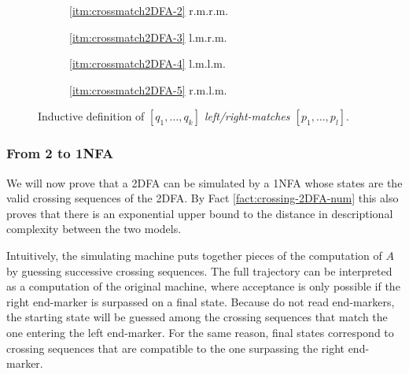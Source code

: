 \begin{figure}
    \centering
    \begin{subfigure}{0.246\textwidth}
        \centering
		
		\caption*{\ref{itm:crossmatch2DFA-2} r.m.\tto r.m.}
    \end{subfigure}
    \hfill
    \begin{subfigure}{0.242\textwidth}
        \centering
		
		\caption*{\ref{itm:crossmatch2DFA-3} l.m.\tto r.m.}
    \end{subfigure}
    \hfill
    \begin{subfigure}{0.242\textwidth}
        \centering
		
		\caption*{\ref{itm:crossmatch2DFA-4} l.m.\tto l.m.}
    \end{subfigure}
    \hfill
    \begin{subfigure}{0.246\textwidth}
        \centering
		
		\caption*{\ref{itm:crossmatch2DFA-5} r.m.\tto l.m.}
    \end{subfigure}
	\caption{Inductive definition of \emph{$[q_1,\dots,q_k]$ left/right-matches $[p_1,\dots,p_l]$}.}
    \label{fig:2DFA-crossmatch}
\end{figure}

\subsubsection{From 2\DFAs{} to 1NFA}
We will now prove that a 2DFA can be simulated by a 1NFA whose states are the valid crossing sequences of the 2DFA.
By Fact \ref{fact:crossing-2DFA-num} this also proves that there is an exponential upper bound to the distance in descriptional complexity between the two models.

Intuitively, the simulating machine puts together pieces of the computation of $A$ by guessing successive crossing sequences.
The full trajectory can be interpreted as a computation of the original machine, where acceptance is only possible if the right end-marker is surpassed on a final state.
Because \NFAs{} do not read end-markers, the starting state will be guessed among the crossing sequences that match the one entering the left end-marker.
For the same reason, final states correspond to crossing sequences that are compatible to the one surpassing the right end-marker.


